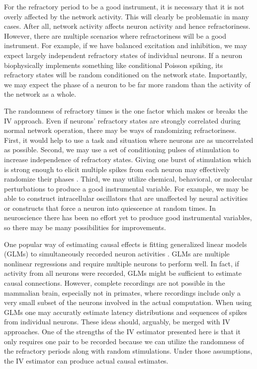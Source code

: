 \documentclass[11pt]{article}
\begin{document}
For the refractory period to be a good instrument, it is necessary that it is not overly affected by the network activity. 
This will clearly be problematic in many cases. 
After all, network activity affects neuron activity and hence refractoriness. 
However, there are multiple scenarios where refractoriness will be a good instrument. 
For example, if we have balanced excitation and inhibition, we may expect largely independent refractory states of individual neurons. 
If a neuron biophysically implements something like conditional Poisson spiking, its refractory states will be random conditioned on the network state. 
Importantly, we may expect the phase of a neuron to be far more random than the activity of the network as a whole.

The randomness of refractory times is the one factor which makes or breaks the IV approach. 
Even if neurons' refractory states are strongly correlated during normal network operation, there may be ways of randomizing refractoriness. 
First, it would help to use a task and situation where neurons are as uncorrelated as possible. 
Second, we may use a set of conditioning pulses of stimulation to increase independence of refractory states. 
Giving one burst of stimulation which is strong enough to elicit multiple spikes from each neuron may effectively randomize their phases \citep{ermentrout2008reliability}.
Third, we may utilize chemical, behavioral, or molecular perturbations to produce a good instrumental variable. 
For example, we may be able to construct intracellular oscillators that are unaffected by neural activities or constructs that force a neuron into quiescence at random times. 
In neuroscience there has been no effort yet to produce good instrumental variables, so there may be many possibilities for improvements.

One popular way of estimating causal effects is fitting generalized linear models (GLMs) to simultaneously recorded neuron activities \citep{pillow2008spatio, roudi2009ising}. 
GLMs are multiple nonlinear regressions and require multiple neurons to perform well. 
In fact, if activity from all neurons were recorded, GLMs might be sufficient to estimate causal connections. 
However, complete recordings are not possible in the mammalian brain, especially not in primates, where recordings include only a very small subset of the neurons involved in the actual computation. 
When using GLMs one may accuratly estimate latency distributions and sequences of spikes from individual neurons. 
These ideas should, arguably, be merged with IV approaches. 
One of the strengths of the IV estimator presented here is that it only requires one pair to be recorded because we can utilize the randomness of the refractory periods along with random stimulations. Under those assumptions, the IV estimator can produce actual causal estimates. 
\end{document}
